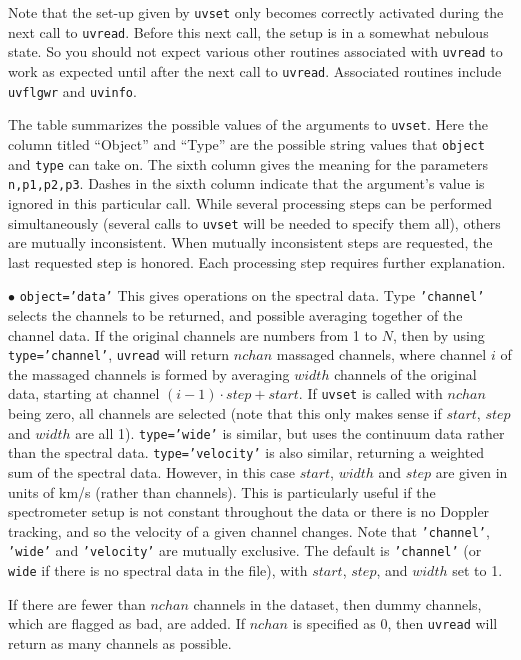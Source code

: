 Note that the set-up given by {\tt uvset} only becomes correctly
activated during the next call to {\tt uvread}. Before this next call,
the setup is in a somewhat nebulous state. So you should not expect
various other routines associated with {\tt uvread} to work
as expected until after the next call to {\tt uvread}. Associated
routines include {\tt uvflgwr} and {\tt uvinfo}.

The table summarizes the possible values of the arguments to {\tt uvset}.
Here the column titled ``Object'' and ``Type'' are the possible string
values that {\tt object} and {\tt type} can take on. The sixth column
gives the meaning for the parameters {\tt n,p1,p2,p3}.
Dashes in the sixth column indicate that the argument's value is ignored in
this particular call. While several processing steps can be performed
simultaneously (several calls to {\tt uvset} will be needed to specify them
all), others are mutually inconsistent. When mutually inconsistent
steps are requested, the last requested step is honored. Each processing
step requires further explanation. 
\item{$\bullet$} {\tt object='data'} This gives operations on the spectral
data. Type {\tt 'channel'} selects the channels to be returned, and possible
averaging together of the channel data. If the original channels are
numbers from 1 to $N$, then by using {\tt type='channel'}, {\tt uvread} will
return $nchan$ massaged channels, where channel $i$ of the massaged channels
is formed by averaging $width$ channels of the original data, starting at
channel $(i-1)\cdot step + start$.  If {\tt uvset} is called with $nchan$
being zero, all channels are selected (note that this only makes sense if
$start$, $step$ and $width$ are all 1).  {\tt type='wide'} is similar, but
uses the continuum data rather than the spectral data.  {\tt type='velocity'}
is also similar, returning a weighted sum of the spectral data. However, in
this case $start$, $width$ and $step$ are given in units of km/s (rather
than channels). This is particularly useful if the spectrometer setup is not
constant throughout the data or there is no Doppler tracking, and so the
velocity of a given channel changes.  Note that {\tt 'channel'},
{\tt 'wide'} and {\tt 'velocity'} are mutually exclusive. The default is
{\tt 'channel'} (or {\tt wide} if there is no spectral data in the file),
with $start$, $step$, and $width$ set to 1.

If there are fewer than $nchan$ channels in the dataset, then dummy channels,
which are flagged as bad, are added. If $nchan$ is specified as 0, then
{\tt uvread} will return as many channels as possible.

